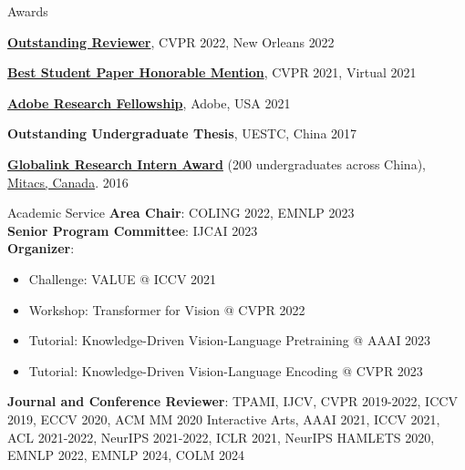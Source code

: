 \documentclass{resume} %
\begin{document}
\begin{rSection}{Awards}
\item {\textbf{\href{https://cvpr2022.thecvf.com/outstanding-reviewers}{Outstanding Reviewer}}, CVPR 2022, New Orleans } \hfill {2022}
\item {\textbf{\href{http://cvpr2021.thecvf.com/node/329}{Best Student Paper Honorable Mention}}, CVPR 2021, Virtual } \hfill {2021}
\item {\textbf{\href{https://research.adobe.com/fellowship/}{Adobe Research Fellowship}}, Adobe, USA} \hfill {2021}
\item {\textbf{Outstanding Undergraduate Thesis}, UESTC, China} \hfill {2017}
\item {\textbf{\href{https://www.mitacs.ca/en/programs/globalink/globalink-research-internship}{Globalink Research Intern Award}} (200 undergraduates across China), \href{https://www.mitacs.ca/en}{Mitacs, Canada}. } \hfill {2016}
\end{rSection}





\begin{rSection}{Academic Service}
    \textbf{Area Chair}: COLING 2022, EMNLP 2023  \\
    \textbf{Senior Program Committee}: IJCAI 2023  \\
    \textbf{Organizer}:
    \begin{itemize}[label=$\cdot$]
    \item Challenge: VALUE @ ICCV 2021
    \item Workshop: Transformer for Vision @ CVPR 2022
    \item Tutorial: Knowledge-Driven Vision-Language Pretraining @ AAAI 2023
    \item Tutorial: Knowledge-Driven Vision-Language Encoding @ CVPR 2023
    \end{itemize}
    \textbf{Journal and Conference Reviewer}: TPAMI, IJCV, CVPR 2019-2022, ICCV 2019, ECCV 2020, ACM MM 2020 Interactive Arts, AAAI 2021, ICCV 2021, ACL 2021-2022, NeurIPS 2021-2022, ICLR 2021, NeurIPS HAMLETS 2020, EMNLP 2022, EMNLP 2024, COLM 2024
\end{rSection}
\end{document}
